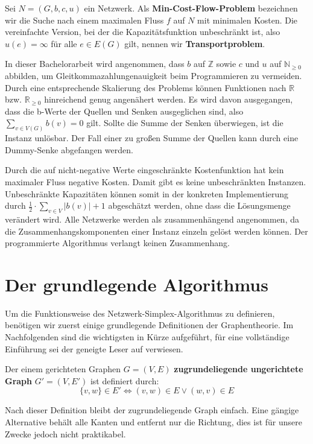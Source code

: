 \begin{defn}Sei $N=(G,b,c,u)$ ein Netzwerk. Als \textbf{Min-Cost-Flow-Problem} bezeichnen wir die Suche nach einem maximalen Fluss $f$ auf $N$ mit minimalen Kosten. Die vereinfachte Version, bei der die Kapazitätsfunktion unbeschränkt ist, also $u(e)=\infty$ für alle $e\in E(G)$ gilt, nennen wir \textbf{Transportproblem}.\end{defn}

In dieser Bachelorarbeit wird angenommen, dass $b$ auf $\mathbb{Z}$ sowie $c$ und $u$ auf $\mathbb{N}_{\geq0}$ abbilden, um Gleitkommazahlungenauigkeit beim Programmieren zu vermeiden. Durch eine entsprechende Skalierung des Problems können Funktionen nach $\mathbb{R}$ bzw. $\mathbb{R}_{\geq 0}$ hinreichend genug angenähert werden. Es wird davon ausgegangen, dass die b-Werte der Quellen und Senken ausgeglichen sind, also $\sum_{v\in V(G)} b(v) = 0$ gilt. Sollte die Summe der Senken überwiegen, ist die Instanz unlösbar. Der Fall einer zu großen Summe der Quellen kann durch eine Dummy-Senke\footnotemark{} abgefangen werden.


Durch die auf nicht-negative Werte eingeschränkte Kostenfunktion hat kein maximaler Fluss negative Kosten. Damit gibt es keine unbeschränkten Instanzen. Unbeschränkte Kapazitäten können somit in der konkreten Implementierung durch $\frac{1}{2}\cdot\sum_{v\in V} |b(v)| + 1$ abgeschätzt werden, ohne dass die Lösungsmenge verändert wird. Alle Netzwerke werden als zusammenhängend angenommen, da die Zusammenhangskomponenten einer Instanz einzeln gelöst werden können. Der programmierte Algorithmus verlangt keinen Zusammenhang.

\section{Der grundlegende Algorithmus}\label{ch:alg}
Um die Funktionsweise des Netzwerk-Simplex-Algorithmus zu definieren, benötigen wir zuerst einige grundlegende Definitionen der Graphentheorie. Im Nachfolgenden sind die wichtigsten in Kürze aufgeführt, für eine vollständige Einführung sei der geneigte Leser auf \cite{Alma} verwiesen.

\begin{defn}Der einem gerichteten Graphen $G=(V,E)$ \textbf{zugrundeliegende ungerichtete Graph} $G'=(V,E')$ ist definiert durch:
\begin{equation*}\{v,w\}\in E' \iff (v,w) \in E \lor (w,v) \in E\end{equation*} \end{defn}
\begin{anm}Nach dieser Definition bleibt der zugrundeliegende Graph einfach. Eine gängige Alternative behält alle Kanten und entfernt nur die Richtung, dies ist für unsere Zwecke jedoch nicht praktikabel.\end{anm}

